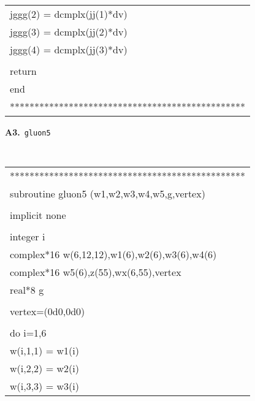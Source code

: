 \begin{center}
{\begin{supertabular}{l}
      \hspace{0.5em} jggg(2) = dcmplx(jj(1)*dv)\\
      \hspace{0.5em} jggg(3) = dcmplx(jj(2)*dv)\\
      \hspace{0.5em} jggg(4) = dcmplx(jj(3)*dv)\\
\\
      \hspace{0.5em} return\\
      \hspace{0.5em} end\\
************************************************\\
\end{supertabular}
}

\vspace{1em}
{\bf A3.}~{\tt gluon5}\\
{\tt
\begin{supertabular}{l}
************************************************\\
      \hspace{0.5em} subroutine gluon5 (w1,w2,w3,w4,w5,g,vertex)\\
\\
     \hspace{0.5em} implicit none\\
\\
     \hspace{0.5em} integer i\\
     \hspace{0.5em} complex*16 w(6,12,12),w1(6),w2(6),w3(6),w4(6)\\
     \hspace{0.5em} complex*16 w5(6),z(55),wx(6,55),vertex    \\
     \hspace{0.5em} real*8 g    \\
      \\
     \hspace{0.5em} vertex=(0d0,0d0)     \\
\\
     \hspace{0.5em} do i=1,6\\
     \hspace{1em}    w(i,1,1) = w1(i)\\
     \hspace{1em}    w(i,2,2) = w2(i)\\
     \hspace{1em}    w(i,3,3) = w3(i)\\

\end{supertabular}}
\end{center}
